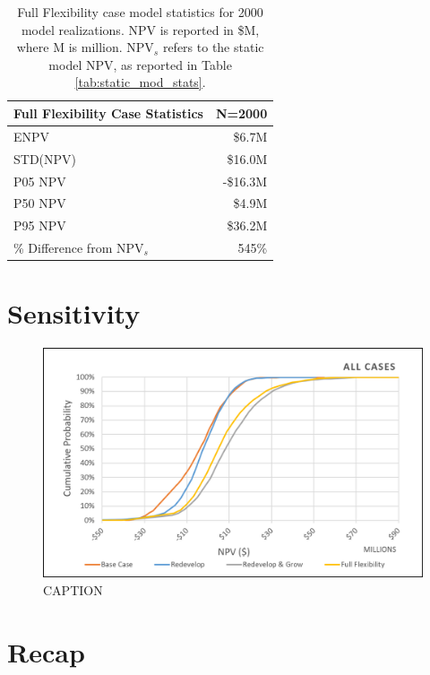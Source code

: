 \begin{table}[!htp]
\centering
\begin{tabular}{|l|r|}
\hline
\textbf{Full Flexibility Case Statistics} & N=2000 \\ \hline
ENPV & \$6.7M \\ \hline
STD(NPV) & \$16.0M \\ \hline
P05 NPV & -\$16.3M \\ \hline
P50 NPV & \$4.9M \\ \hline
P95 NPV & \$36.2M \\ \hline
\% Difference from NPV$_{s}$ & 545\% \\ \hline
\end{tabular}
\caption[Full Flexibility Case statistics]{Full Flexibility case model statistics for 2000 model realizations. NPV is reported in \$M, where M is million. NPV$_s$ refers to the static model NPV, as reported in Table \ref{tab:static_mod_stats}.}
\label{tab:reduce_stats}
\end{table}

\section{Sensitivity}

\begin{figure}[!htp]
\centering
\includegraphics[width=.98\textwidth]{templates/images/Figure-All_Case_CDF.png}
\caption[All Cases CDF]{CAPTION}
\label{fig:all_case_cdf}
\end{figure}



\section{Recap}